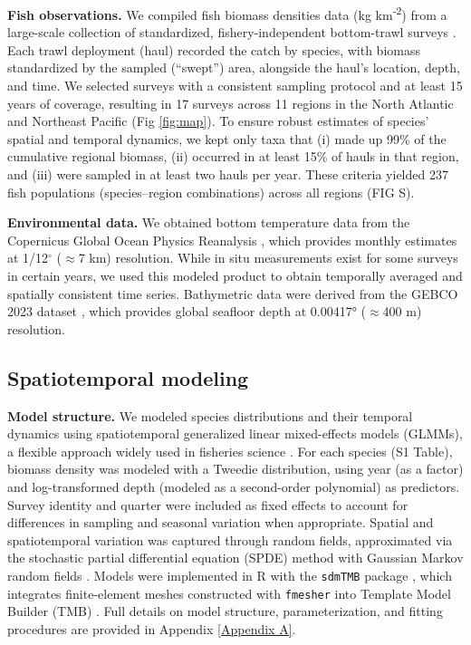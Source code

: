 \documentclass[lineno,pdflatex,sn-nature]{sn-jnl}%
\begin{document}
\textbf{Fish observations.} We compiled fish biomass densities data (kg km\textsuperscript{-2}) from 
a large-scale collection of standardized, fishery-independent bottom-trawl surveys \citep{maureaud_fishglob_data_2024}. Each trawl deployment (haul) recorded the catch by species, with biomass standardized by the sampled (``swept'') area, alongside the haul’s location, depth, and time. We selected surveys with a consistent sampling protocol and at least 15 years of coverage, resulting in 17 surveys across 11 regions in the North Atlantic and Northeast Pacific (Fig \ref{fig:map}).
To ensure robust estimates of species’ spatial and temporal dynamics, we kept only taxa that (i) made up 99\% of the cumulative regional biomass, (ii) occurred in at least 15\% of hauls in that region, and (iii) were sampled in at least two hauls per year. These criteria yielded 237 fish populations (species–region combinations) across all regions (FIG S).

\textbf{Environmental data.} We obtained bottom temperature data from the Copernicus Global Ocean Physics Reanalysis \citep{european_union-copernicus_marine_service_global_2018}, which provides monthly estimates at 1/12$^{\circ}$ ($\approx$7 km) resolution. While in situ measurements exist for some surveys in certain years, we used this modeled product to obtain temporally averaged and spatially consistent time series. Bathymetric data were derived from the GEBCO 2023 dataset \citep{gebco_bathymetric_compilation_group_2023_gebco_2023_2023}, which provides global seafloor depth at 0.00417° ($\approx$400 m) resolution.



\subsection{Spatiotemporal modeling}\label{sec:Species spatiotemporal modeling}

\textbf{Model structure.} We modeled species distributions and their temporal dynamics using spatiotemporal generalized linear mixed-effects models (GLMMs), a flexible approach widely used in fisheries science \citep{thorson_geostatistical_2015, thorson_model-based_2016}. For each species (S1 Table), biomass density was modeled with a Tweedie distribution, using year (as a factor) and log-transformed depth (modeled as a second-order polynomial) as predictors. Survey identity and quarter were included as fixed effects to account for differences in sampling and seasonal variation when appropriate. Spatial and spatiotemporal variation was captured through random fields, approximated via the stochastic partial differential equation (SPDE) method with Gaussian Markov random fields \citep{lindgren_explicit_2011}. Models were implemented in R with the \texttt{sdmTMB} package \citep{anderson_sdmtmb_2024}, which integrates finite-element meshes constructed with \texttt{fmesher} \citep{lindgren_fmesher_2025} into Template Model Builder (TMB) \citep{kristensen_tmb_2016}. Full details on model structure, parameterization, and fitting procedures are provided in Appendix \ref{Appendix A}.
\end{document}
